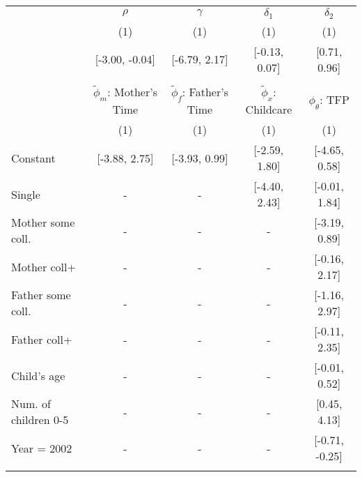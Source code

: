 \begin{tabular}{lcccc}\\\toprule
 & \multicolumn{1}{c}{$\rho$} & \multicolumn{1}{c}{$\gamma $} & \multicolumn{1}{c}{$\delta_{1}$} & \multicolumn{1}{c}{$\delta_{2}$} \\
&(1)&(1)&(1)&(1)\\\cmidrule(r){2-2}\cmidrule(r){3-3}\cmidrule(r){4-4}\cmidrule(r){5-5}
&[-3.00, -0.04]&[-6.79, 2.17]&[-0.13, 0.07]&[0.71, 0.96]\\
&&&&\\
 & \multicolumn{1}{c}{$\tilde{\phi}_{m}$: Mother's Time} & \multicolumn{1}{c}{$\tilde{\phi}_{f}$: Father's Time} & \multicolumn{1}{c}{$\tilde{\phi}_{x}$: Childcare} & \multicolumn{1}{c}{$\phi_{\theta}$: TFP} \\
&(1)&(1)&(1)&(1)\\\cmidrule(r){2-2}\cmidrule(r){3-3}\cmidrule(r){4-4}\cmidrule(r){5-5}
Constant&[-3.88, 2.75]&[-3.93, 0.99]&[-2.59, 1.80]&[-4.65, 0.58]\\
Single&-&-&[-4.40, 2.43]&[-0.01, 1.84]\\
Mother some coll.&-&-&-&[-3.19, 0.89]\\
Mother coll+&-&-&-&[-0.16, 2.17]\\
Father some coll.&-&-&-&[-1.16, 2.97]\\
Father coll+&-&-&-&[-0.11, 2.35]\\
Child's age&-&-&-&[-0.01, 0.52]\\
Num. of children 0-5&-&-&-&[0.45, 4.13]\\
Year = 2002&-&-&-&[-0.71, -0.25]\\
\\
\bottomrule\end{tabular}